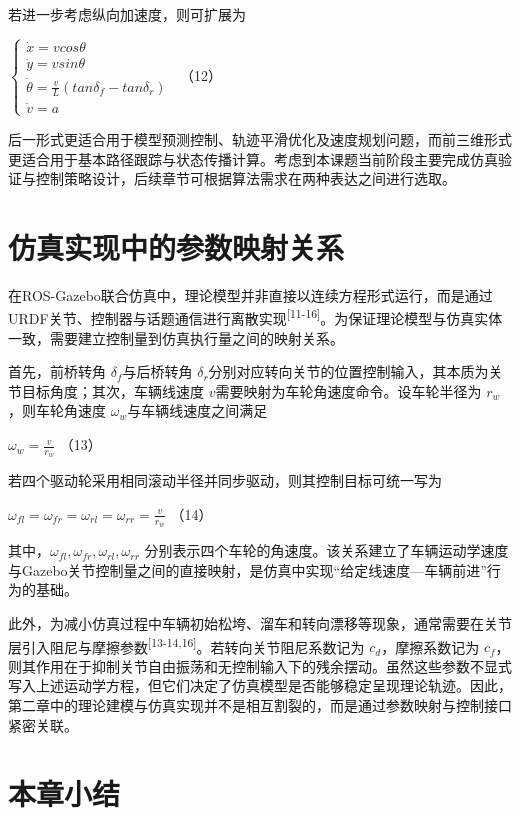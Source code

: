 若进一步考虑纵向加速度，则可扩展为

\(\left\{ \begin{array}{r}
\dot{x} = vcos\theta \\
\dot{y} = vsin\theta \\
\dot{\theta} = \frac{v}{L}\left( tan\delta_{f} - tan\delta_{r} \right) \\
\dot{v} = a
\end{array} \right.\ \) （12）

后一形式更适合用于模型预测控制、轨迹平滑优化及速度规划问题，而前三维形式更适合用于基本路径跟踪与状态传播计算。考虑到本课题当前阶段主要完成仿真验证与控制策略设计，后续章节可根据算法需求在两种表达之间进行选取。

\section{仿真实现中的参数映射关系}

在ROS-Gazebo联合仿真中，理论模型并非直接以连续方程形式运行，而是通过URDF关节、控制器与话题通信进行离散实现\textsuperscript{[11-16]}。为保证理论模型与仿真实体一致，需要建立控制量到仿真执行量之间的映射关系。

首先，前桥转角 \(\delta_{f}\)与后桥转角
\(\delta_{r}\)分别对应转向关节的位置控制输入，其本质为关节目标角度；其次，车辆线速度
\(v\)需要映射为车轮角速度命令。设车轮半径为 \(r_{w}\)，则车轮角速度
\(\omega_{w}\)与车辆线速度之间满足

\(\omega_{w} = \frac{v}{r_{w}}\) （13）

若四个驱动轮采用相同滚动半径并同步驱动，则其控制目标可统一写为

\(\omega_{fl} = \omega_{fr} = \omega_{rl} = \omega_{rr} = \frac{v}{r_{w}}\)
（14）

其中，\(\omega_{fl},\omega_{fr},\omega_{rl},\omega_{rr}\)
分别表示四个车轮的角速度。该关系建立了车辆运动学速度与Gazebo关节控制量之间的直接映射，是仿真中实现“给定线速度---车辆前进”行为的基础。

此外，为减小仿真过程中车辆初始松垮、溜车和转向漂移等现象，通常需要在关节层引入阻尼与摩擦参数\textsuperscript{[13-14,16]}。若转向关节阻尼系数记为
\(c_{d}\)，摩擦系数记为
\(c_{f}\)，则其作用在于抑制关节自由振荡和无控制输入下的残余摆动。虽然这些参数不显式写入上述运动学方程，但它们决定了仿真模型是否能够稳定呈现理论轨迹。因此，第二章中的理论建模与仿真实现并不是相互割裂的，而是通过参数映射与控制接口紧密关联。

\section{本章小结}


